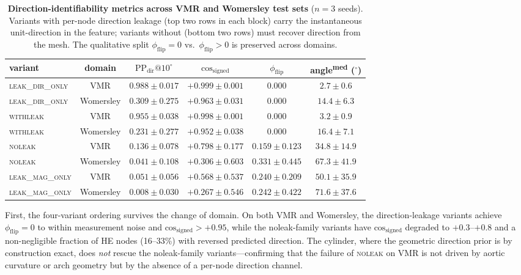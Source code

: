 \documentclass[10pt,a4paper]{article}
\makeatletter
\newcommand{\withleak}{\textsc{withleak}}
\newcommand{\dironly}{\textsc{leak\_dir\_only}}
\newcommand{\magonly}{\textsc{leak\_mag\_only}}
\newcommand{\noleak}{\textsc{noleak}}
\newcommand{\PPdir}[1]{\mathrm{PP_{dir}}@#1^\circ}
\newcommand{\cosgn}{\mathrm{cos}_\mathrm{signed}}
\newcommand{\fracflip}{\phi_\mathrm{flip}}
\makeatother
\begin{document}
\begin{table}[h]
\centering
\small
\begin{tabular}{lccccc}
\toprule
variant & domain & $\PPdir{10}$ & $\cosgn$ & $\fracflip$ & angle\textsuperscript{med} ($^\circ$) \\
\midrule
\dironly{} & VMR        & $0.988 \pm 0.017$ & $+0.999 \pm 0.001$ & $0.000$ & $2.7 \pm 0.6$ \\
\dironly{} & Womersley  & $0.309 \pm 0.275$ & $+0.963 \pm 0.031$ & $0.000$ & $14.4 \pm 6.3$ \\
\withleak{} & VMR       & $0.955 \pm 0.038$ & $+0.998 \pm 0.001$ & $0.000$ & $3.2 \pm 0.9$ \\
\withleak{} & Womersley & $0.231 \pm 0.277$ & $+0.952 \pm 0.038$ & $0.000$ & $16.4 \pm 7.1$ \\
\midrule
\noleak{} & VMR        & $0.136 \pm 0.078$ & $+0.798 \pm 0.177$ & $\mathbf{0.159 \pm 0.123}$ & $34.8 \pm 14.9$ \\
\noleak{} & Womersley  & $0.041 \pm 0.108$ & $+0.306 \pm 0.603$ & $\mathbf{0.331 \pm 0.445}$ & $67.3 \pm 41.9$ \\
\magonly{} & VMR       & $0.051 \pm 0.056$ & $+0.568 \pm 0.537$ & $\mathbf{0.240 \pm 0.209}$ & $50.1 \pm 35.9$ \\
\magonly{} & Womersley & $0.008 \pm 0.030$ & $+0.267 \pm 0.546$ & $\mathbf{0.242 \pm 0.422}$ & $71.6 \pm 37.6$ \\
\bottomrule
\end{tabular}
\caption{\textbf{Direction-identifiability metrics across VMR and Womersley test sets} ($n=3$ seeds). Variants with per-node direction leakage (top two rows in each block) carry the instantaneous unit-direction in the feature; variants without (bottom two rows) must recover direction from the mesh. The qualitative split $\fracflip=0$ vs.\ $\fracflip>0$ is preserved across domains.}
\label{tab:cross_domain}
\end{table}

First, the four-variant ordering survives the change of domain. On
both VMR and Womersley, the direction-leakage variants achieve
$\fracflip=0$ to within measurement noise and $\cosgn>+0.95$, while
the noleak-family variants have $\cosgn$ degraded to $+0.3$--$+0.8$
and a non-negligible fraction of HE nodes (16--33\%) with reversed
predicted direction. The cylinder, where the geometric direction
prior is by construction exact, does \emph{not} rescue the
noleak-family variants---confirming that the failure of \noleak{} on
VMR is not driven by aortic curvature or arch geometry but by the
absence of a per-node direction channel.
\end{document}

